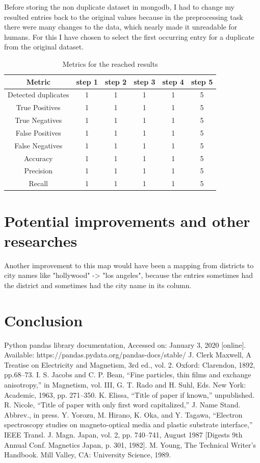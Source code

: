 \documentclass[conference]{IEEEtran}
\begin{document}
Before storing the non duplicate dataset in mongodb, I had to change my resulted entries back to the original values because in the preprocessing task there were many changes to the data, which nearly made it unreadable for humans. For this I have chosen to select the first occurring entry for a duplicate from the original dataset.
\begin{table}[t]
\begin{center}
		\caption{Metrics for the reached results}
	\label{tab:results} 
	\begin{tabular}{|c||c|c|c|c|c|}
		\hline
		Metric & step 1 & step 2 & step 3 & step 4 & step 5 \\ 
		\hline\hline
		Detected duplicates &1 & 1&1& 1&5\\
		\hline
		True Positives &1 & 1&1& 1&5  \\ 
		\hline
		True Negatives &1 & 1&1& 1&5  \\  
		\hline
		False Positives &1 & 1&1& 1&5     \\  
		\hline
		False Negatives &1 & 1&1& 1&5    \\  
		\hline
		Accuracy &1 & 1&1& 1&5    \\  
		\hline
		Precision &1 & 1&1& 1&5    \\  
		\hline
		Recall &1 & 1&1& 1&5 \\
		\hline
	\end{tabular}
\end{center}
\end{table}
\section{Potential improvements and other researches} \label{sec_improvements}
Another improvement to this map would have been a mapping from districts to city names like "hollywood" -> "los angeles", because the entries sometimes had the district and sometimes had the city name in its column.
\section{Conclusion}
\begin{thebibliography}{00}
	 Python pandas library documentation, Accessed on: January 3, 2020 [online].
	Available: https://pandas.pydata.org/pandas-docs/stable/
	 J. Clerk Maxwell, A Treatise on Electricity and Magnetism, 3rd ed., vol. 2. Oxford: Clarendon, 1892, pp.68--73.
	 I. S. Jacobs and C. P. Bean, ``Fine particles, thin films and exchange anisotropy,'' in Magnetism, vol. III, G. T. Rado and H. Suhl, Eds. New York: Academic, 1963, pp. 271--350.
	 K. Elissa, ``Title of paper if known,'' unpublished.
	 R. Nicole, ``Title of paper with only first word capitalized,'' J. Name Stand. Abbrev., in press.
	 Y. Yorozu, M. Hirano, K. Oka, and Y. Tagawa, ``Electron spectroscopy studies on magneto-optical media and plastic substrate interface,'' IEEE Transl. J. Magn. Japan, vol. 2, pp. 740--741, August 1987 [Digests 9th Annual Conf. Magnetics Japan, p. 301, 1982].
	 M. Young, The Technical Writer's Handbook. Mill Valley, CA: University Science, 1989.
\end{thebibliography}
\end{document}
